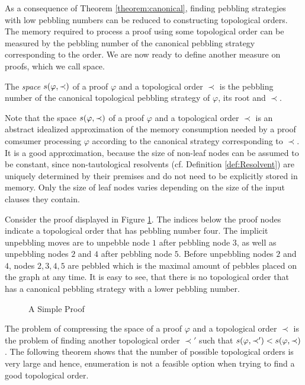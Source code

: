 As a consequence of Theorem \ref{theorem:canonical}, finding pebbling strategies with low pebbling numbers can be reduced to constructing topological orders.
The memory required to process a proof using some topological order can be measured by the pebbling number of the canonical pebbling strategy corresponding to the order.
We are now ready to define another measure on proofs, which we call space.

\begin{definition}
\label{def:space measure}
The \emph{space} $s(\varphi,\prec)$ 
of a proof $\varphi$ and a topological order $\prec$ is the pebbling number of the canonical topological pebbling strategy of $\varphi$, its root and $\prec$.
\end{definition}

Note that the space $s(\varphi,\prec)$ of a proof $\varphi$ and a topological order $\prec$ is an abstract idealized approximation of the memory consumption needed by a proof comsumer processing $\varphi$ according to the canonical strategy corresponding to $\prec$. It is a good approximation, because the size of non-leaf nodes can be assumed to be constant, since non-tautological resolvents (cf. Definition \ref{def:Resolvent})  are uniquely determined by their premises and do not need to be explicitly stored in memory. Only the size of leaf nodes varies depending on the size of the input clauses they contain.


\begin{example}

Consider the proof displayed in Figure \ref{fig:spaceproof}.
The indices below the proof nodes indicate a topological order that has pebbling number four.
The implicit unpebbling moves are to unpebble node $1$ after pebbling node $3$, as well as unpebbling nodes $2$ and $4$ after pebbling node $5$.
Before unpebbling nodes $2$ and $4$, nodes $2,3,4,5$ are pebbled which is the maximal amount of pebbles placed on the graph at any time.
It is easy to see, that there is no topological order that has a canonical pebbling strategy with a lower pebbling number.

\begin{figure}[!h]

\caption{A Simple Proof}
\label{fig:spaceproof}
\end{figure}

\end{example}

The problem of compressing the space of a proof $\varphi$ and a topological order $\prec$ is the problem of finding another topological order $\prec'$ such that $s(\varphi,\prec') < s(\varphi,\prec)$. The following theorem shows that the number of possible topological orders is very large and hence, enumeration is not a feasible option when trying to find a good topological order.

